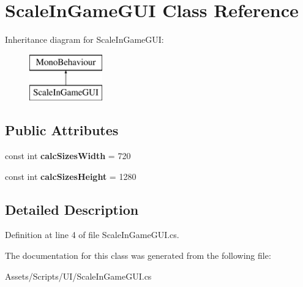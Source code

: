 \hypertarget{class_scale_in_game_g_u_i}{\section{Scale\+In\+Game\+G\+U\+I Class Reference}
\label{class_scale_in_game_g_u_i}
}
Inheritance diagram for Scale\+In\+Game\+G\+U\+I\+:\begin{figure}[H]
\begin{center}
\leavevmode
\includegraphics[height=2.000000cm]{class_scale_in_game_g_u_i}
\end{center}
\end{figure}
\subsection*{Public Attributes}
\begin{DoxyCompactItemize}
\item 
\hypertarget{class_scale_in_game_g_u_i_ad1e5aa3fc09488374a71b38602f16f93}{const int {\bfseries calc\+Sizes\+Width} = 720}\label{class_scale_in_game_g_u_i_ad1e5aa3fc09488374a71b38602f16f93}

\item 
\hypertarget{class_scale_in_game_g_u_i_a63c80e42c3125a8b865b812c9e1f5d70}{const int {\bfseries calc\+Sizes\+Height} = 1280}\label{class_scale_in_game_g_u_i_a63c80e42c3125a8b865b812c9e1f5d70}

\end{DoxyCompactItemize}


\subsection{Detailed Description}


Definition at line 4 of file Scale\+In\+Game\+G\+U\+I.\+cs.



The documentation for this class was generated from the following file\+:\begin{DoxyCompactItemize}
\item 
Assets/\+Scripts/\+U\+I/Scale\+In\+Game\+G\+U\+I.\+cs\end{DoxyCompactItemize}
